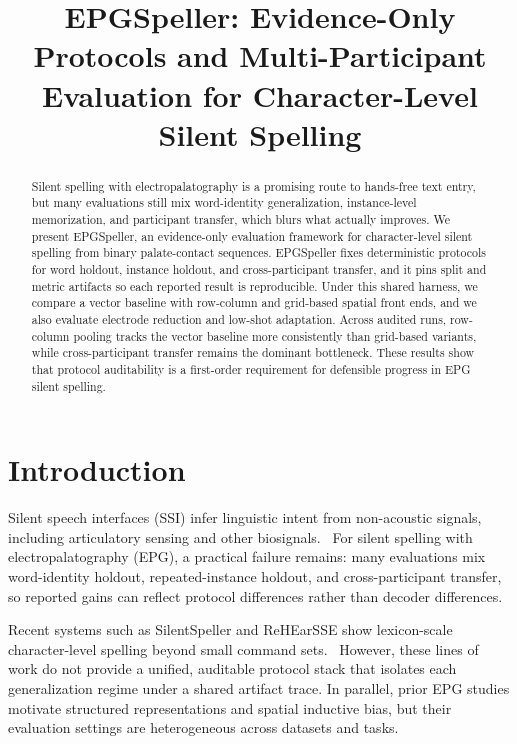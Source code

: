 \documentclass{Interspeech}
\title{EPGSpeller: Evidence-Only Protocols and Multi-Participant Evaluation for Character-Level Silent Spelling}
\begin{document}
\maketitle

\begin{abstract}

Silent spelling with electropalatography is a promising route to hands-free text entry, but many evaluations still mix word-identity generalization, instance-level memorization, and participant transfer, which blurs what actually improves. We present EPGSpeller, an evidence-only evaluation framework for character-level silent spelling from binary palate-contact sequences. EPGSpeller fixes deterministic protocols for word holdout, instance holdout, and cross-participant transfer, and it pins split and metric artifacts so each reported result is reproducible. Under this shared harness, we compare a vector baseline with row-column and grid-based spatial front ends, and we also evaluate electrode reduction and low-shot adaptation. Across audited runs, row-column pooling tracks the vector baseline more consistently than grid-based variants, while cross-participant transfer remains the dominant bottleneck. These results show that protocol auditability is a first-order requirement for defensible progress in EPG silent spelling.

\end{abstract}

\section{Introduction}

Silent speech interfaces (SSI) infer linguistic intent from non-acoustic signals, including articulatory sensing and other biosignals.~\cite{denby2010silent,freitas2017an,gonzalez2020silent,hardcastle1989new,hardcastle1990electropalatography,lee2021biosignal,verhoeven2019visualisation,woo2021design} For silent spelling with electropalatography (EPG), a practical failure remains: many evaluations mix word-identity holdout, repeated-instance holdout, and cross-participant transfer, so reported gains can reflect protocol differences rather than decoder differences.

Recent systems such as SilentSpeller and ReHEarSSE show lexicon-scale character-level spelling beyond small command sets.~\cite{denby2010silent,dong2024rehearsse,gilbert2010isolated,graves2006connectionist,hueber2010development,kimura2022silentspeller} However, these lines of work do not provide a unified, auditable protocol stack that isolates each generalization regime under a shared artifact trace. In parallel, prior EPG studies motivate structured representations and spatial inductive bias, but their evaluation settings are heterogeneous across datasets and tasks.~\cite{carreira1998dimensionality,hardcastle1991epg,shadle1993depth,toutios2006learning,toutios2006on}
\end{document}
